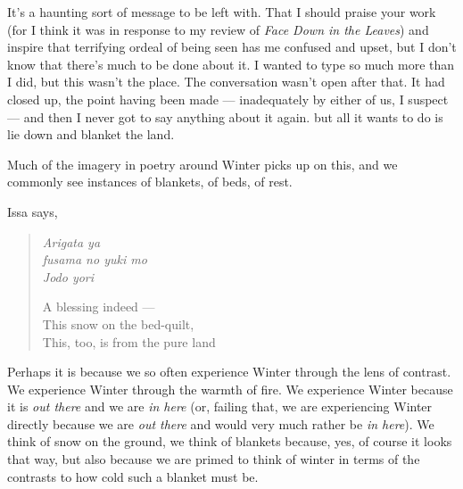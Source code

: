 \documentclass[12pt,oneside]{memoir}
\begin{document}
{It's a haunting sort of message to be left with. That I should praise your work (for I think it was in response to my review of \emph{Face Down in the Leaves}) and inspire that terrifying ordeal of being seen has me confused and upset, but I don't know that there's much to be done about it. I wanted to type so much more than I did, but this wasn't the place. The conversation wasn't open after that. It had closed up, the point having been made --- inadequately by either of us, I suspect --- and then I never got to say anything about it again.} but all it wants to do is lie down and blanket the land.

Much of the imagery in poetry around Winter picks up on this, and we commonly see instances of blankets, of beds, of rest.

Issa says,

\begin{verse}
\emph{Arigata ya} \\
\emph{fusama no yuki mo} \\
\emph{Jodo yori}

A blessing indeed --- \\
This snow on the bed-quilt, \\
This, too, is from the pure land

\parencite[46]{issa}
\end{verse}

Perhaps it is because we so often experience Winter through the lens of contrast. We experience Winter through the warmth of fire. We experience Winter because it is \emph{out there} and we are \emph{in here} (or, failing that, we are experiencing Winter directly because we are \emph{out there} and would very much rather be \emph{in here}). We think of snow on the ground, we think of blankets because, yes, of course it looks that way, but also because we are primed to think of winter in terms of the contrasts to how cold such a blanket must be.
\end{document}
